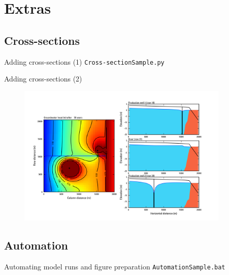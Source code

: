 \documentclass[t]{beamer}
\begin{document}
\section{Extras}
\subsection{Cross-sections}
\begin{frame}{Adding cross-sections (1)}
	\small{\texttt{Cross-sectionSample.py}}
	\vspace{-15pt}\begin{figure}[ht]
		\centering
	        \lstset{numbers=left}
	        
	\end{figure}
\end{frame}

\begin{frame}{Adding cross-sections (2)}
	\vspace{-10pt}\begin{figure}[ht]
		\centering
		\hspace{20pt}\includegraphics[width=0.90\textwidth]{figures/SWI_Results_0000054750.png} 
	 \end{figure}
\end{frame}

\subsection{Automation}
\begin{frame}{Automating model runs and figure preparation}
	\small{\texttt{AutomationSample.bat}}
	\vspace{-15pt}\begin{figure}[ht]
		\centering
	        \lstset{numbers=left}
	        
	\end{figure}
\end{frame}
\end{document}

